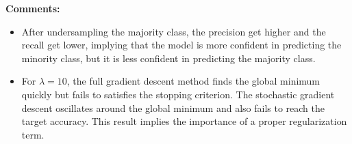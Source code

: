 \begin{exercise}
\begin{enumerate}
\begin{solution}
                {\bf Comments:}
                \begin{itemize}
                    \item After undersampling the majority class, the precision get higher and the recall get lower, implying that the model is more confident in predicting the minority class, but it is less confident in predicting the majority class.
                    \item For $\lambda=10$, the full gradient descent method finds the global minimum quickly but fails to satisfies the stopping criterion. The stochastic gradient descent oscillates around the global minimum and also fails to reach the target accuracy. This result implies the importance of a proper regularization term.
                        \qedhere
                \end{itemize}
            \end{solution}
    \end{enumerate}
\end{exercise}
\clearpage
